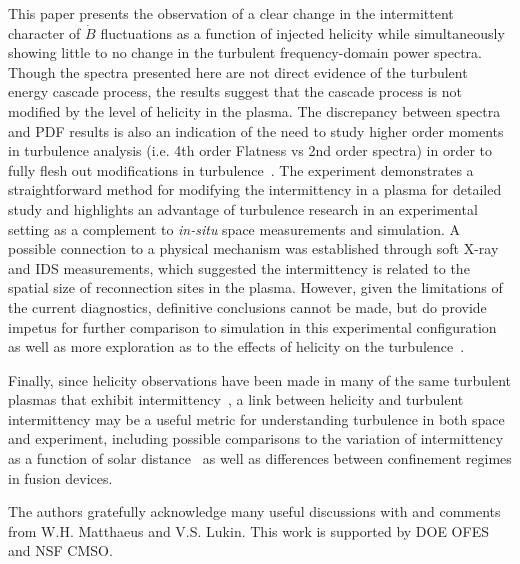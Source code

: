 \documentclass[aps,prl,amsmath,amssymb,reprint,superscriptaddress]{revtex4-1} %
\begin{document}
This paper presents the observation of a clear change in the intermittent character of $\dot{B}$ fluctuations as a function of injected helicity while simultaneously showing little to no change in the turbulent frequency-domain power spectra. Though the spectra presented here are not direct evidence of the turbulent energy cascade process, the results suggest that the cascade process is not modified by the level of helicity in the plasma. The discrepancy between spectra and PDF results is also an indication of the need to study higher order moments in turbulence analysis (i.e. 4th order Flatness vs 2nd order spectra) in order to fully flesh out modifications in turbulence~\cite{matthaeusVelli11}. The experiment demonstrates a straightforward method for modifying the intermittency in a plasma for detailed study and highlights an advantage of turbulence research in an experimental setting as a complement to {\it in-situ} space measurements and simulation. A possible connection to a physical mechanism was established through soft X-ray and IDS measurements, which suggested the intermittency is related to the spatial size of reconnection sites in the plasma. However, given the limitations of the current diagnostics, definitive conclusions cannot be made, but do provide impetus for further comparison to simulation in this experimental configuration~\cite{schaffner14} as well as more exploration as to the effects of helicity on the turbulence~\cite{biskamp00}.

Finally, since helicity observations have been made in many of the same turbulent plasmas that exhibit intermittency~\cite{goldstein94, ji95, telloni12}, a link between helicity and turbulent intermittency may be a useful metric for understanding turbulence in both space and experiment, including possible comparisons to the variation of intermittency as a function of solar distance~\cite{greco12} as well as differences between confinement regimes in fusion devices.

The authors gratefully acknowledge many useful discussions with and comments from W.H. Matthaeus and V.S. Lukin. This work is supported by DOE OFES and NSF CMSO.
\end{document}
